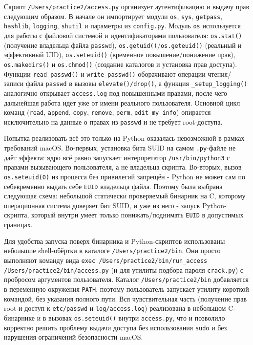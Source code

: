 \documentclass[areasetadvanced]{scrartcl}
\begin{document}
Скрипт \texttt{/Users/practice2/access.py} организует аутентификацию и выдачу прав следующим образом. В начале он импортирует модули \texttt{os}, \texttt{sys}, \texttt{getpass}, \texttt{hashlib}, \texttt{logging}, \texttt{shutil} и параметры из \texttt{config.py}. Модуль \texttt{os} используется для работы с файловой системой и идентификаторами пользователя: \texttt{os.stat()} (получение владельца файла \texttt{passwd}), \texttt{os.getuid()}/\texttt{os.geteuid()} (реальный и эффективный UID), \texttt{os.seteuid()} (временное повышение/понижение прав), \texttt{os.makedirs()} и \texttt{os.chmod()} (создание каталогов и установка прав доступа). Функции \texttt{read\_passwd()} и \texttt{write\_passwd()} оборачивают операции чтения/записи файла \texttt{passwd} в вызовы \texttt{elevate()/drop()}, а функция \texttt{\_setup\_logging()} аналогично открывает \texttt{access.log} под повышенными правами, после чего дальнейшая работа идёт уже от имени реального пользователя. Основной цикл команд (\texttt{read}, \texttt{append}, \texttt{copy}, \texttt{remove}, \texttt{perm}, \texttt{edit my info}) опирается исключительно на данные о правах из \texttt{passwd} и не требует root-доступа.

Попытка реализовать всё это только на Python оказалась невозможной в рамках требований macOS. Во-первых, установка бита SUID на самом \texttt{.py}-файле не даёт эффекта: ядро всё равно запускает интерпретатор \texttt{/usr/bin/python3} с правами вызывающего пользователя, а не владельца скрипта. Во-вторых, вызов \texttt{os.seteuid(0)} из процесса без привилегий запрещён - Python не может \guillemetleft сам по себе\guillemetright временно выдать себе \texttt{EUID} владельца файла. Поэтому была выбрана следующая схема: небольшой статически проверяемый бинарник на C, которому операционная система доверяет бит SUID, и уже из него - запуск Python-скрипта, который внутри умеет только понижать/поднимать \texttt{EUID} в допустимых границах.

Для удобства запуска поверх бинарника и Python-скриптов использованы небольшие shell-обёртки в каталоге \texttt{/Users/practice2/bin}. Они просто выполняют команду вида \texttt{exec /Users/practice2/bin/run\_access /Users/practice2/bin/access.py} (и для утилиты подбора пароля \texttt{crack.py}) с пробросом аргументов пользователя. Каталог \texttt{/Users/practice2/bin} добавляется в переменную окружения \texttt{PATH}, поэтому пользователь запускает утилиту короткой командой, без указания полного пути. Вся чувствительная часть (получение прав root и доступ к \texttt{etc/passwd} и \texttt{log/access.log}) реализована в небольшом C-бинарнике и в вызовах \texttt{os.seteuid()} внутри \texttt{access.py}, что и позволило корректно решить проблему выдачи доступа без использования \texttt{sudo} и без нарушения ограничений безопасности macOS.
\end{document}
